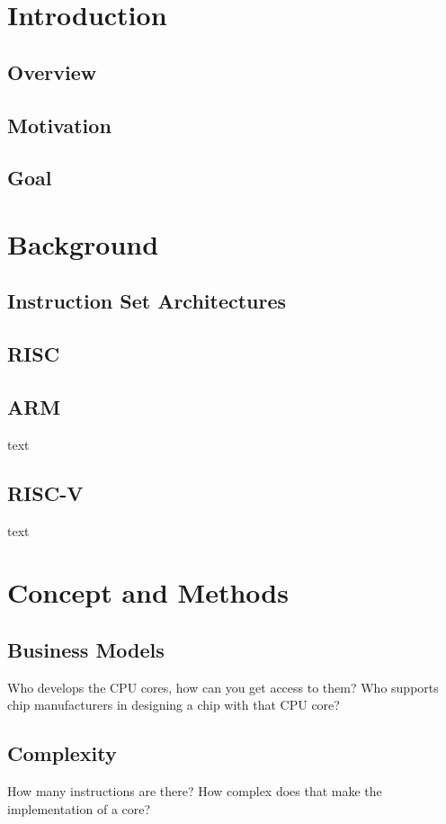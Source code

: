 \documentclass[conference]{IEEEtran}
\begin{document}
\section{Introduction}
\label{ref:introduction}
	\subsection{Overview}
	\subsection{Motivation}
	\subsection{Goal}

\section{Background}
\label{ref:background}
	\subsection{Instruction Set Architectures}
	\subsection{RISC}
	\subsection{ARM}
	text
	\subsection{RISC-V}
	text

\section{Concept and Methods}
\label{ref:concept}
	\subsection{Business Models}
	Who develops the CPU cores, how can you get access to them? Who supports chip manufacturers in designing a chip with that CPU core?
	\subsection{Complexity}
	How many instructions are there? How complex does that make the implementation of a core?
\end{document}
